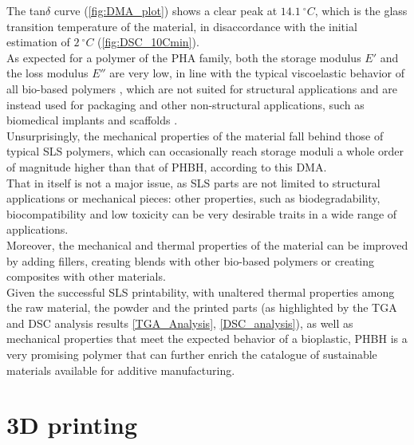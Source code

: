 \documentclass{article}
\begin{document}
        \clearpage 

        The tan$\delta$ curve (\ref{fig:DMA_plot}) shows a clear peak at $14.1 \ ^{\circ}C$, which is the glass transition temperature of the material, 
        in disaccordance with the initial estimation of $2 \ ^{\circ}C$ (\ref{fig:DSC_10Cmin}). \\ 

        As expected for a polymer of the PHA family, both the storage modulus $E'$ and the loss modulus $E''$ are very low, in line with the 
        typical viscoelastic behavior of all bio-based polymers \autocites{Kovalcik_PHA_Review}, which are not suited for structural applications and 
        are instead used for packaging and other non-structural applications, such as biomedical implants and scaffolds \autocites{Messori_Bondioli_PHAs}. \\

        Unsurprisingly, the mechanical properties of the material fall behind those of typical SLS polymers, which can 
        occasionally reach storage moduli a whole order of magnitude higher than that of PHBH, according to this DMA. \\ 

        That in itself is not a major issue, as SLS parts are not limited to structural applications or mechanical pieces:
        other properties, such as biodegradability, biocompatibility and low toxicity can be very desirable traits in a wide range of 
        applications. \\ 

        Moreover, the mechanical and thermal properties of the material can be improved by adding fillers, creating blends with other 
        bio-based polymers or creating composites with other materials. \\ 

        Given the successful SLS printability, with unaltered thermal properties among the raw material, the powder and the 
        printed parts (as highlighted by the TGA and DSC analysis results \ref{TGA_Analysis}, \ref{DSC_analysis}), as well as 
        mechanical properties that meet the expected behavior of a bioplastic, PHBH is a very promising polymer 
        that can further enrich the catalogue of sustainable materials available for additive manufacturing. \\ 



    \clearpage
    \section{3D printing\label{SLS_printing_experimental}}
\end{document}
